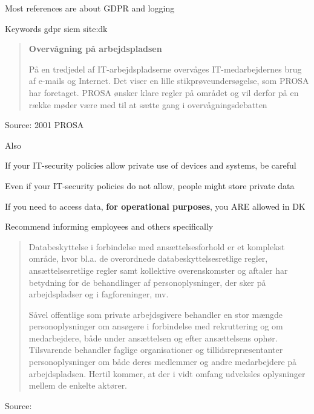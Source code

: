 \documentclass[Screen16to9,17pt]{foils}
\begin{document}
\begin{list2}
\item Most references are about GDPR and logging
\item Keywords gdpr siem site:dk
  \item {}
\end{list2}




\begin{quote}{\bf
  Overvågning på arbejdspladsen}

  På en tredjedel af IT-arbejdspladserne overvåges IT-medarbejdernes brug af e-mails og Internet. Det viser en lille stikprøveundersøgelse, som PROSA har foretaget. PROSA ønsker klare regler på området og vil derfor på en række møder være med til at sætte gang i overvågningsdebatten
\end{quote}
Source: 2001 PROSA {\footnotesize{}}

\begin{list2}
  \item Also {\footnotesize{}}
\item If your IT-security policies allow private use of devices and systems, be careful
\item Even if your IT-security policies do not allow, people might store private data
\item If you need to access data, {\bf for operational purposes}, you ARE allowed in DK
\item Recommend informing employees and others specifically
\end{list2}



\begin{quote}
Databeskyttelse i forbindelse med ansættelsesforhold er et komplekst område, hvor bl.a. de overordnede databeskyttelsesretlige regler, ansættelsesretlige regler samt kollektive overenskomster og aftaler har betydning for de behandlinger af personoplysninger, der sker på arbejdspladser og i fagforeninger, mv.

Såvel offentlige som private arbejdsgivere behandler en stor mængde personoplysninger om ansøgere i forbindelse med rekruttering og om medarbejdere, både under ansættelsen og efter ansættelsens ophør. Tilsvarende behandler faglige organisationer og tillidsrepræsentanter personoplysninger om både deres medlemmer og andre medarbejdere på arbejdspladsen. Hertil kommer, at der i vidt omfang udveksles oplysninger mellem de enkelte aktører.
\end{quote}
Source: {\footnotesize{}}
\end{document}
